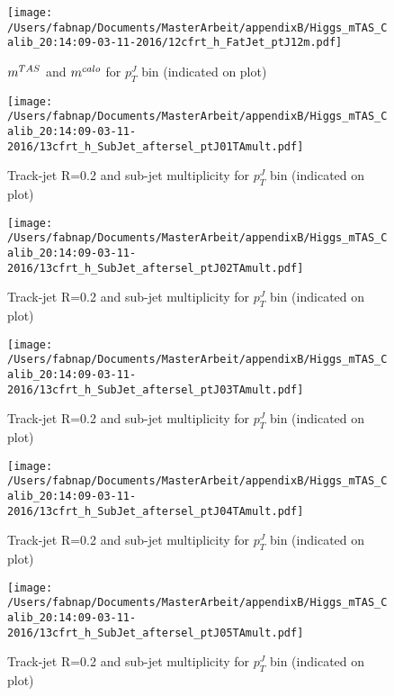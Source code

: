 \begin{figure}
 
\texttt{[image: /Users/fabnap/Documents/MasterArbeit/appendixB/Higgs\_mTAS\_Calib\_20:14:09-03-11-2016/12cfrt\_h\_FatJet\_ptJ12m.pdf]}
\caption{$m^{TAS}$ and $m^{calo}$ for $p_{T}^{J}$ bin (indicated on plot) }
 
\end{figure}
\clearpage %
\begin{figure}
 
\texttt{[image: /Users/fabnap/Documents/MasterArbeit/appendixB/Higgs\_mTAS\_Calib\_20:14:09-03-11-2016/13cfrt\_h\_SubJet\_aftersel\_ptJ01TAmult.pdf]}
\caption{Track-jet R=0.2 and sub-jet multiplicity for $p_{T}^{J}$ bin (indicated on plot) }
 
\end{figure}
 
\begin{figure}
 
\texttt{[image: /Users/fabnap/Documents/MasterArbeit/appendixB/Higgs\_mTAS\_Calib\_20:14:09-03-11-2016/13cfrt\_h\_SubJet\_aftersel\_ptJ02TAmult.pdf]}
\caption{Track-jet R=0.2 and sub-jet multiplicity for $p_{T}^{J}$ bin (indicated on plot) }
 
\end{figure}
 
\begin{figure}
 
\texttt{[image: /Users/fabnap/Documents/MasterArbeit/appendixB/Higgs\_mTAS\_Calib\_20:14:09-03-11-2016/13cfrt\_h\_SubJet\_aftersel\_ptJ03TAmult.pdf]}
\caption{Track-jet R=0.2 and sub-jet multiplicity for $p_{T}^{J}$ bin (indicated on plot) }
 
\end{figure}
 
\begin{figure}
 
\texttt{[image: /Users/fabnap/Documents/MasterArbeit/appendixB/Higgs\_mTAS\_Calib\_20:14:09-03-11-2016/13cfrt\_h\_SubJet\_aftersel\_ptJ04TAmult.pdf]}
\caption{Track-jet R=0.2 and sub-jet multiplicity for $p_{T}^{J}$ bin (indicated on plot) }
 
\end{figure}
 
\begin{figure}
 
\texttt{[image: /Users/fabnap/Documents/MasterArbeit/appendixB/Higgs\_mTAS\_Calib\_20:14:09-03-11-2016/13cfrt\_h\_SubJet\_aftersel\_ptJ05TAmult.pdf]}
\caption{Track-jet R=0.2 and sub-jet multiplicity for $p_{T}^{J}$ bin (indicated on plot) }
 
\end{figure}
 
